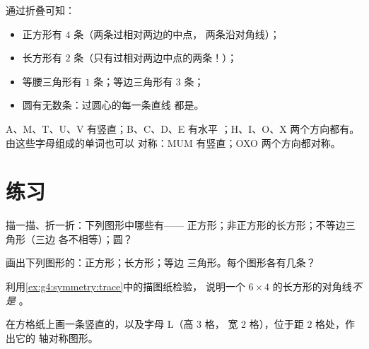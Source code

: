 \begin{example}[数一数对称轴]\label{ex:g4:symmetry:shapes}
通过折叠可知：
\begin{itemize}
  \item 正方形有 $4$ 条（两条过相对两边的中点，
        两条沿对角线）；
  \item 长方形有 $2$ 条（只有过相对两边中点的两条！）；
  \item 等腰三角形有 $1$ 条；等边三角形有 $3$ 条；
  \item 圆有无数条：过圆心的每一条直线
        都是。
\end{itemize}
\end{example}

\begin{example}[字母中的对称]\label{ex:g4:symmetry:letters}
A、M、T、U、V 有竖直；B、C、D、E 有水平
；H、I、O、X 两个方向都有。由这些字母组成的单词也可以
对称：MUM 有竖直；OXO 两个方向都对称。
\end{example}

\section{练习}

\begin{exercise}[$\star$]\label{exo:g4:symmetry:1}
描一描、折一折：下列图形中哪些有——
正方形；非正方形的长方形；不等边三角形（三边
各不相等）；圆？
\end{exercise}

\begin{exercise}[$\star$]\label{exo:g4:symmetry:2}
画出下列图形的：正方形；长方形；等边
三角形。每个图形各有几条？
\end{exercise}

\begin{exercise}[$\star$]\label{exo:g4:symmetry:3}
利用\cref{ex:g4:symmetry:trace}中的描图纸检验，
说明一个 $6 \times 4$ 的长方形的对角线\emph{不是}
。
\end{exercise}

\begin{exercise}[$\star$]\label{exo:g4:symmetry:4}
在方格纸上画一条竖直的，以及字母 L（高 3 格，
宽 2 格），位于距 $2$ 格处，作出它的
轴对称图形。
\end{exercise}

